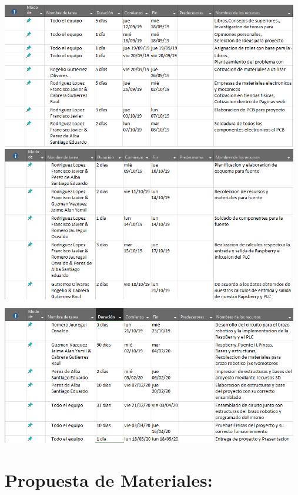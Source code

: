 \documentclass[14pt,a4paper]{article}
\begin{document}
\begin{center}

\includegraphics[width=13cm]{Esquema1.png} 
\includegraphics[width=13cm]{Esquema2.png} 
\includegraphics[width=13cm]{Esquema3.png} 

\end{center}

\section{Propuesta de Materiales:}
\end{document}
